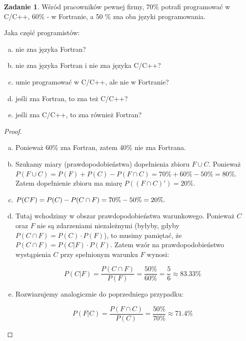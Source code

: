 \documentclass[11pt]{article}
\theoremstyle{definition}
\newtheorem{zadanie}{Zadanie}
\numberwithin{zadanie}{section}
\begin{document}
\begin{zadanie}
    Wśród pracowników pewnej firmy, 70\% potrafi programować w C/C++, 60\% - w Fortranie, a 50 \% zna oba języki programowania.

    Jaka część programistów:
    \begin{enumerate}[a)]
        \item nie zna języka Fortran?
        \item nie zna języka Fortran i nie zna języka C/C++?
        \item umie programować w C/C++, ale nie w Fortranie?
        \item jeśli zna Fortran, to zna też C/C++?
        \item jeśli zna C/C++, to zna również Fortran?
    \end{enumerate}
\end{zadanie}
\begin{proof}
    \begin{enumerate}[a)]
        \item Ponieważ 60\% zna Fortran, zatem 40\% nie zna Fortrana.
        \item Szukamy miary (prawdopodobieństwa) dopełnienia zbioru $F\cup C$. Ponieważ $P(F\cup C) = P(F) + P(C) - P(F\cap C) = 70\% + 60\% - 50\% = 80\%$. Zatem dopełnienie zbioru ma miarę $P((F\cap C)') = 20\%$.
        \item $P(C \\ F) = P(C) - P(C\cap F) = 70\% - 50\% = 20\%.$
        \item Tutaj wchodzimy w obszar prawdopodobieństwa warunkowego. Ponieważ $C$ oraz $F$ nie są zdarzeniami niezależnymi (byłyby, gdyby $P(C\cap F) = P(C)\cdot P(F)$), to musimy pamiętać, że $P(C\cap F) = P(C|F) \cdot P(F)$. Zatem wzór na prawdopodobieństwo wystąpienia $C$ przy spełnionym warunku $F$ wynosi:

              $$P(C|F) = \frac{P(C\cap F)}{P(F)} = \frac{50\%}{60\%} = \frac56 \approx 83.33 \%$$




        \item Rozwiazujemy analogicznie do poprzedniego przypadku:

              $$P(F|C) = \frac{P(F\cap C)}{P(C)} = \frac{50\%}{70\%} \approx 71.4\%$$

    \end{enumerate}
\end{proof}
\end{document}
